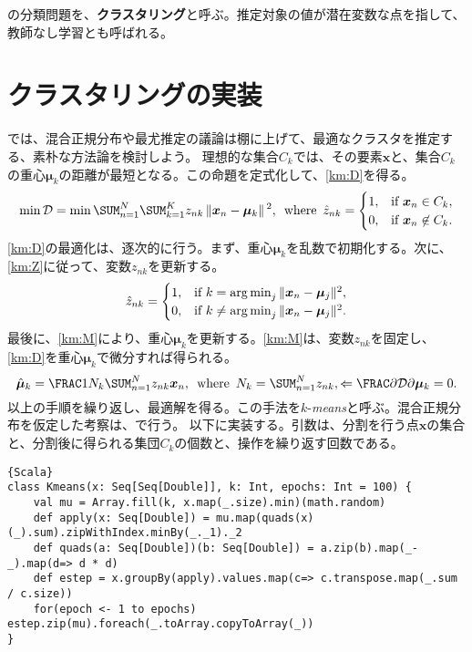 \documentclass[10pt,a4paper]{book}
\begin{document}
の分類問題を、\textbf{クラスタリング}と呼ぶ。推定対象の値が潜在変数な点を指して、教師なし学習とも呼ばれる。

\section{クラスタリングの実装\label{sect:km}}

では、混合正規分布や最尤推定の議論は棚に上げて、最適なクラスタを推定する、素朴な方法論を検討しよう。
理想的な集合$C_k$では、その要素$\bm{x}$と、集合$C_k$の重心$\bm{\mu}_k$の距離が最短となる。この命題を定式化して、\eqref{km:D}を得る。
%
\begin{equation}
\label{eq:km:D}
\min \mathcal{D} =
\min \sum_{n=1}^N \sum_{k=1}^K z_{nk} \norm{\bm{x}_n-\bm{\mu}_k}^2,
\where
\hat{z}_{nk} =
\begin{cases}
1,& \text{if $\bm{x}_n     \in C_k$},\\
0,& \text{if $\bm{x}_n \not\in C_k$}.
\end{cases}
\end{equation}
%
\eqref{km:D}の最適化は、逐次的に行う。まず、重心$\bm{\mu}_k$を乱数で初期化する。次に、\eqref{km:Z}に従って、変数$z_{nk}$を更新する。
%
\begin{equation}
\label{eq:km:Z}
\hat{z}_{nk} =
\begin{cases}
1,& \text{if $k=   \argmin_j\norm{\bm{x}_n-\bm{\mu}_j}^2$},\\
0,& \text{if $k\neq\argmin_j\norm{\bm{x}_n-\bm{\mu}_j}^2$}.
\end{cases}
\end{equation}
%
最後に、\eqref{km:M}により、重心$\bm{\mu}_k$を更新する。\eqref{km:M}は、変数$z_{nk}$を固定し、\eqref{km:D}を重心$\bm{\mu}_k$で微分すれば得られる。
%
\begin{equation}
\label{eq:km:M}
\hat{\bm{\mu}}_k = \frac{1}{N_k} \sum_{n=1}^N z_{nk} \bm{x}_n,
\where
N_k = \sum_{n=1}^N z_{nk},
\Leftarrow
\pdiff{\mathcal{D}}{\bm{\mu}_k} = 0.
\end{equation}
%
以上の手順を繰り返し、最適解を得る。この手法を$k$-\textit{means}と呼ぶ。混合正規分布を仮定した考察は、で行う。
以下に実装する。引数は、分割を行う点$\bm{x}$の集合と、分割後に得られる集団$C_k$の個数と、操作を繰り返す回数である。

\begin{Verbatim}{Scala}
class Kmeans(x: Seq[Seq[Double]], k: Int, epochs: Int = 100) {
	val mu = Array.fill(k, x.map(_.size).min)(math.random)
	def apply(x: Seq[Double]) = mu.map(quads(x)(_).sum).zipWithIndex.minBy(_._1)._2
	def quads(a: Seq[Double])(b: Seq[Double]) = a.zip(b).map(_-_).map(d=> d * d)
	def estep = x.groupBy(apply).values.map(c=> c.transpose.map(_.sum / c.size))
	for(epoch <- 1 to epochs) estep.zip(mu).foreach(_.toArray.copyToArray(_))
}
\end{Verbatim}
\end{document}
